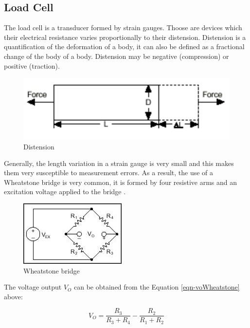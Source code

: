 \subsection{Load Cell}

	The load cell is a transducer formed by strain gauges. Thoose are devices which their electrical resistance varies proportionally to their distension. Distension is a quantification of the deformation of a body, it can also be defined as a fractional change of the body of a body. Distension may be negative (compression) or positive (traction).

	\begin{figure}[htbp]
		\centering
			\includegraphics[scale=0.6]{figuras/fig-distension.png}
		\caption{Distension \cite{strain-def}}
		\label{fig-distension}
	\end{figure}

	Generally, the length variation in a strain gauge is very small and this makes them very susceptible to measurement errors. As a result, the use of a Wheatstone bridge is very common, it is formed by four resistive arms and an excitation voltage applied to the bridge \cite{window1982strain}.

	\begin{figure}[htbp]
		\centering
			\includegraphics[scale=1.45]{figuras/fig-wheatstone.jpg}
		\caption{Wheatstone bridge \cite{wheat-bridge}}
		\label{fig-wheatstone}
	\end{figure}

	The voltage output $V_{O}$ can be obtained from the Equation \ref{eqn-voWheatstone} above:

	\begin{equation}\label{eqn-voWheatstone}
		V_{O}=\frac{ R_{3} }{ R_{3} + R_{4} } - \frac{ R_{2} }{ R_{1} + R_{2}}
	\end{equation}
